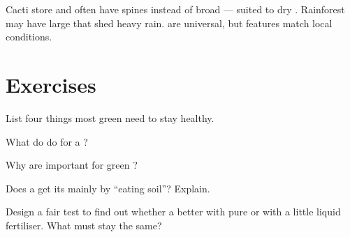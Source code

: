 \begin{example}\label{ex:g4:plants-need:habitats}
Cacti store  and often have spines instead of broad  ---
suited to dry . Rainforest  may have large  that shed
heavy rain.   are universal, but  features match local
conditions.
\end{example}

\section{Exercises}

\begin{exercise}[$\star$]\label{exo:g4:plants-need:1}
List four things most green  need to stay healthy.
\end{exercise}

\begin{exercise}[$\star$]\label{exo:g4:plants-need:2}
What do  do for a ?
\end{exercise}

\begin{exercise}[$\star$]\label{exo:g4:plants-need:3}
Why are  important for green ?
\end{exercise}

\begin{exercise}[$\star$]\label{exo:g4:plants-need:4}
Does a  get its  mainly by ``eating soil''? Explain.
\end{exercise}

\begin{exercise}[$\star\star$]\label{exo:g4:plants-need:5}
Design a fair test to find out whether a   better with pure
 or with a little liquid fertiliser. What must stay the same?
\end{exercise}

